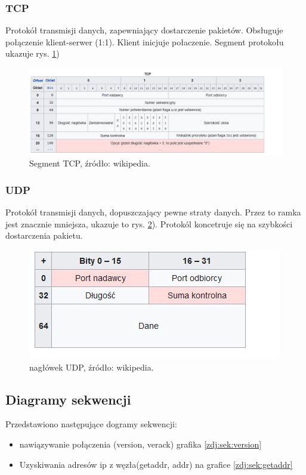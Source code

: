 \documentclass[a4paper,polish,12pt]{article}
\begin{document}
\subsubsection{TCP}
Protokół transmisji danych, zapewniający dostarczenie pakietów. Obsługuje połączenie klient-serwer (1:1). Klient inicjuje połaczenie. Segment protokołu ukazuje rys. \ref{zdj:3})
\begin{figure}
\label{zdj:3}
\centering
\includegraphics[width=\textwidth]{2.jpg}
\caption { Segment TCP, źródło: wikipedia.}
\end{figure}

\subsubsection{UDP}
Protokół transmisji danych,  dopuszczający pewne straty danych. Przez to ramka jest znacznie mniejsza, ukazuje to rys. \ref{zdj:4}). Protokól koncetruje się na szybkości dostarczenia pakietu.
\begin{figure}
\label{zdj:4}
\centering
\includegraphics[width=\textwidth]{3.jpg}
\caption { nagłówek UDP, źródło: wikipedia.}
\end{figure}
\subsection{Diagramy sekwencji}
Przedstawiono następujące dogramy sekwencji:
\begin{itemize}
\item nawiązywanie połączenia (version, verack) grafika \ref{zdj:sek:version}
\item Uzyskiwania adresów ip z węzła(getaddr, addr) na grafice \ref{zdj:sek:getaddr}
\end{itemize}
\end{document}
